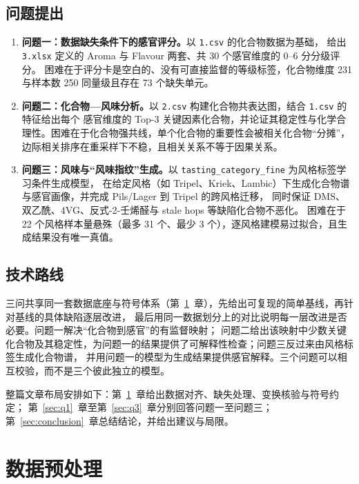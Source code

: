 ﻿\documentclass[UTF8,a4paper,zihao=-4]{ctexart}
\numberwithin{figure}{section}
\numberwithin{table}{section}
\numberwithin{equation}{section}
\newcommand{\file}[1]{\texttt{#1}}
\begin{document}
\subsection{问题提出}

\begin{enumerate}[label=（\arabic*）,leftmargin=2.5em,itemsep=2pt]
  \item \textbf{问题一：数据缺失条件下的感官评分。}以 \file{1.csv} 的化合物数据为基础，
  给出 \file{3.xlsx} 定义的 Aroma 与 Flavour 两套、共 30 个感官维度的 0--6 分分级评分。
  困难在于评分卡是空白的、没有可直接监督的等级标签，化合物维度 231 与样本数 250 同量级且存在 73 个缺失单元。
  \item \textbf{问题二：化合物—风味分析。}以 \file{2.csv} 构建化合物共表达图，结合 \file{1.csv} 的特征给出每个
  感官维度的 Top-3 关键因素化合物，并论证其稳定性与化学合理性。困难在于化合物强共线，单个化合物的重要性会被相关化合物“分摊”，
  边际相关排序在重采样下不稳，且相关关系不等于因果关系。
  \item \textbf{问题三：风味与“风味指纹”生成。}以 \file{tasting\_category\_fine} 为风格标签学习条件生成模型，
  在给定风格（如 Tripel、Kriek、Lambic）下生成化合物谱与感官画像，并完成 Pils/Lager 到 Tripel 的跨风格迁移，
  同时保证 DMS、双乙酰、4VG、反式-2-壬烯醛与 stale hops 等缺陷化合物不恶化。
  困难在于 22 个风格样本量悬殊（最多 31 个、最少 3 个），逐风格建模易过拟合，且生成结果没有唯一真值。
\end{enumerate}

\subsection{技术路线}

三问共享同一套数据底座与符号体系（第~\ref{sec:preprocess}~章），先给出可复现的简单基线，再针对基线的具体缺陷逐层改进，
最后用同一数据划分上的对比说明每一层改进是否必要。问题一解决“化合物到感官”的有监督映射；
问题二给出该映射中少数关键化合物及其稳定性，为问题一的结果提供了可解释性检查；问题三反过来由风格标签生成化合物谱，
并用问题一的模型为生成结果提供感官解释。三个问题可以相互校验，而不是三个彼此独立的模型。

整篇文章布局安排如下：第~\ref{sec:preprocess}~章给出数据对齐、缺失处理、变换核验与符号约定；
第~\ref{sec:q1}~章至第~\ref{sec:q3}~章分别回答问题一至问题三；第~\ref{sec:conclusion}~章总结结论，并给出建议与局限。


\section{数据预处理}
\label{sec:preprocess}
\end{document}
